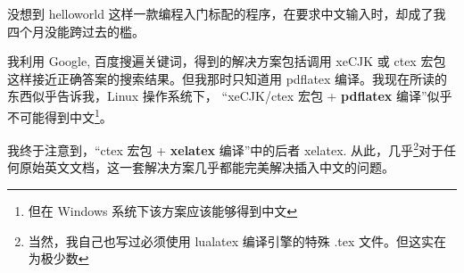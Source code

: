 
% 
% 
没想到 helloworld 这样一款编程入门标配的程序，在要求中文输入时，却成了我四个月没能跨过去的槛。

我利用 Google, 百度搜遍关键词，得到的解决方案包括调用 xeCJK 或 ctex 宏包这样接近正确答案的搜索结果。但我那时只知道用 pdflatex 编译。我现在所读的东西似乎告诉我，Linux 操作系统下， “xeCJK/ctex 宏包 + \textbf{pdflatex} 编译”似乎不可能得到中文\footnote{但在 Windows 系统下该方案应该能够得到中文}。

我终于注意到，“ctex 宏包 + \textbf{xelatex} 编译”中的后者 xelatex. 从此，几乎\footnote{当然，我自己也写过必须使用 lualatex 编译引擎的特殊 .tex 文件。但这实在为极少数}对于任何原始英文文档，这一套解决方案几乎都能完美解决插入中文的问题。